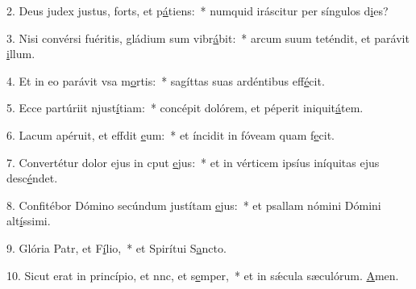 2. Deus judex justus, forts, et p\uline{á}tiens:~* numquid iráscitur per síngulos d\uline{i}es?\par 
3. Nisi convérsi fuéritis, gládium sum vibr\uline{á}bit:~* arcum suum teténdit, et parávit \uline{i}llum.\par 
4. Et in eo parávit vsa m\uline{o}rtis:~* sagíttas suas ardéntibus eff\uline{é}cit.\par 
5. Ecce partúriit njust\uline{í}tiam:~* concépit dolórem, et péperit iniquit\uline{á}tem.\par 
6. Lacum apéruit, et effdit \uline{e}um:~* et íncidit in fóveam quam f\uline{e}cit.\par 
7. Convertétur dolor ejus in cput \uline{e}jus:~* et in vérticem ipsíus iníquitas ejus desc\uline{é}ndet.\par 
8. Confitébor Dómino secúndum justítam \uline{e}jus:~* et psallam nómini Dómini alt\uline{í}ssimi.\par 
9. Glória Patr, et F\uline{í}lio,~* et Spirítui S\uline{a}ncto.\par 
10. Sicut erat in princípio, et nnc, et s\uline{e}mper,~* et in sǽcula sæculórum. \uline{A}men.\par 
